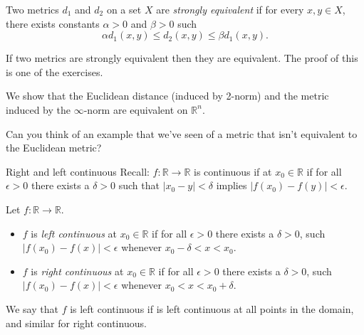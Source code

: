 \documentclass [aspectratio=169]{beamer}
\newcommand{\R}{{\mathbb{R}}}
\begin{document}
\begin{frame}

\begin{definition}
Two metrics $d_1$ and $d_2$ on a set $X$ are \emph{strongly equivalent} if for every $x,y\in X$, there exists constants $\alpha>0$ and $\beta>0$ such
\begin{equation*}
    \alpha d_1(x,y) \leq d_2(x,y) \leq \beta d_1(x,y).
\end{equation*}
\end{definition}

If two metrics are strongly equivalent then they are equivalent. The proof of this is one of the exercises. 
\end{frame}

\begin{frame}
\begin{example}
We show that the Euclidean distance (induced by 2-norm) and the metric induced by the $\infty$-norm are equivalent on $\R^n$. 
\vspace{5cm}
\end{example}
Can you think of an example that we've seen of a metric that isn't equivalent to the Euclidean metric?
\end{frame}


\begin{frame}{Right and left continuous}
Recall: $f\colon \R \to \R$ is continuous if at $x_0\in \R$ if for all $\epsilon>0$ there exists a $\delta>0$ such that $\vert x_0-y\vert <\delta$ implies $\vert f(x_0)-f(y)\vert<\epsilon$.

\vspace{1em}

\begin{definition} Let $f\colon \R \to \R$.
\begin{itemize}
    \item $f$ is \emph{left continuous} at $x_0\in \R$ if for all $\epsilon >0$ there exists a $\delta>0$, such $\vert f(x_0)-f(x)\vert<\epsilon$ whenever $ x_0-\delta <x<x_0$.
    \item $f$ is \emph{right continuous} at $x_0\in \R$ if for all $\epsilon >0$ there exists a $\delta>0$, such $\vert f(x_0)-f(x)\vert<\epsilon$ whenever $x_0<x<x_0+\delta$.
\end{itemize}
We say that $f$ is left continuous if is left continuous at all points in the domain, and similar for right continuous.
\end{definition}




\end{frame}
\end{document}
